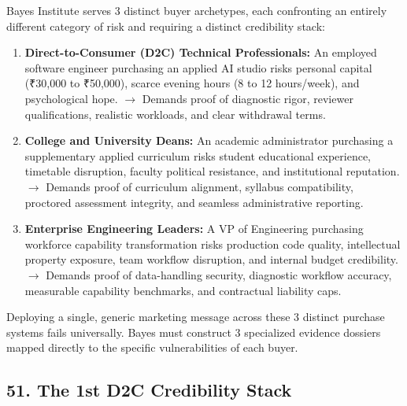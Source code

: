 Bayes Institute serves 3 distinct buyer archetypes, each confronting an entirely different category of risk and requiring a distinct credibility stack:
\begin{enumerate}
\item \textbf{Direct-to-Consumer (D2C) Technical Professionals:} An employed software engineer purchasing an applied AI studio risks personal capital (₹30,000 to ₹50,000), scarce evening hours (8 to 12 hours/week), and psychological hope. $\rightarrow$ Demands proof of diagnostic rigor, reviewer qualifications, realistic workloads, and clear withdrawal terms.
\item \textbf{College and University Deans:} An academic administrator purchasing a supplementary applied curriculum risks student educational experience, timetable disruption, faculty political resistance, and institutional reputation. $\rightarrow$ Demands proof of curriculum alignment, syllabus compatibility, proctored assessment integrity, and seamless administrative reporting.
\item \textbf{Enterprise Engineering Leaders:} A VP of Engineering purchasing workforce capability transformation risks production code quality, intellectual property exposure, team workflow disruption, and internal budget credibility. $\rightarrow$ Demands proof of data-handling security, diagnostic workflow accuracy, measurable capability benchmarks, and contractual liability caps.
\end{enumerate}

Deploying a single, generic marketing message across these 3 distinct purchase systems fails universally. Bayes must construct 3 specialized evidence dossiers mapped directly to the specific vulnerabilities of each buyer.

\subsection*{51. The 1st D2C Credibility Stack}

